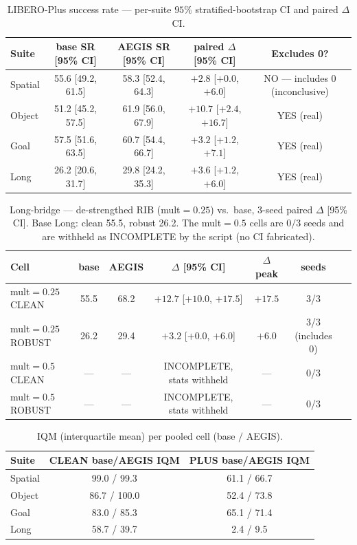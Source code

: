 \begin{table}[h]
\centering
\caption{LIBERO-Plus success rate --- per-suite $95\%$ stratified-bootstrap CI and
paired $\Delta$ CI.}
\label{tab:plus-ci}
\begin{tabular}{lcccc}
\hline
Suite & base SR [95\% CI] & AEGIS SR [95\% CI] & paired $\Delta$ [95\% CI] & Excludes 0? \\
\hline
Spatial & 55.6 [49.2, 61.5] & 58.3 [52.4, 64.3] & $+2.8$ [$+0.0$, $+6.0$] & NO --- includes 0 (inconclusive) \\
Object  & 51.2 [45.2, 57.5] & 61.9 [56.0, 67.9] & $+10.7$ [$+2.4$, $+16.7$] & YES (real) \\
Goal    & 57.5 [51.6, 63.5] & 60.7 [54.4, 66.7] & $+3.2$ [$+1.2$, $+7.1$] & YES (real) \\
Long    & 26.2 [20.6, 31.7] & 29.8 [24.2, 35.3] & $+3.6$ [$+1.2$, $+6.0$] & YES (real) \\
\hline
\end{tabular}
\end{table}

\begin{table}[h]
\centering
\caption{Long-bridge --- de-strengthed RIB (mult$=0.25$) vs.\ base, 3-seed paired
$\Delta$ [95\% CI]. Base Long: clean 55.5, robust 26.2. The mult$=0.5$ cells are
$0/3$ seeds and are withheld as INCOMPLETE by the script (no CI fabricated).}
\label{tab:long-bridge}
\begin{tabular}{lcccccc}
\hline
Cell & base & AEGIS & $\Delta$ [95\% CI] & $\Delta$peak & seeds \\
\hline
mult$=0.25$ CLEAN  & 55.5 & 68.2 & $+12.7$ [$+10.0$, $+17.5$] & $+17.5$ & 3/3 \\
mult$=0.25$ ROBUST & 26.2 & 29.4 & $+3.2$ [$+0.0$, $+6.0$]    & $+6.0$  & 3/3 (includes 0) \\
mult$=0.5$ CLEAN   & --- & --- & INCOMPLETE, stats withheld & --- & 0/3 \\
mult$=0.5$ ROBUST  & --- & --- & INCOMPLETE, stats withheld & --- & 0/3 \\
\hline
\end{tabular}
\end{table}

\begin{table}[h]
\centering
\caption{IQM (interquartile mean) per pooled cell (base $/$ AEGIS).}
\label{tab:iqm}
\begin{tabular}{lcc}
\hline
Suite & CLEAN base/AEGIS IQM & PLUS base/AEGIS IQM \\
\hline
Spatial & 99.0 / 99.3  & 61.1 / 66.7 \\
Object  & 86.7 / 100.0 & 52.4 / 73.8 \\
Goal    & 83.0 / 85.3  & 65.1 / 71.4 \\
Long    & 58.7 / 39.7  & 2.4 / 9.5   \\
\hline
\end{tabular}
\end{table}

